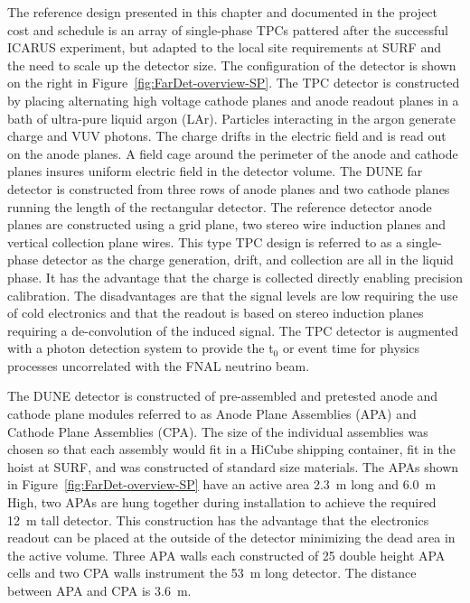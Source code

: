 The reference design presented in this chapter and documented in the project cost and schedule is an array of single-phase TPCs pattered after the successful ICARUS experiment, but adapted to the local site requirements at SURF and the need to scale up the detector size. The configuration of the detector is shown on the right in Figure~\ref{fig:FarDet-overview-SP}.  The TPC detector is constructed by placing alternating high voltage cathode planes and anode readout planes in a bath of ultra-pure liquid argon (LAr). Particles interacting in the argon generate charge and VUV photons. The charge drifts in the electric field and is read out on the anode planes. A field cage around the perimeter of the anode and cathode planes insures uniform electric field in the detector volume. The DUNE far detector is  constructed from three rows of anode planes and two cathode planes running the length of the rectangular detector. The reference detector anode planes are constructed using a grid plane, two stereo wire induction planes and vertical collection plane wires. This type TPC design is referred to as a single-phase detector as the charge generation, drift, and collection are all in the liquid phase. It has the advantage that the charge is collected directly enabling precision calibration. The disadvantages are that the signal levels are low requiring the use of cold electronics and that the readout is based on stereo induction planes requiring a de-convolution of the induced signal. The TPC detector is augmented with a photon detection system to provide the t$_0$ or event time for physics processes uncorrelated with the FNAL neutrino beam.

The DUNE detector is constructed of pre-assembled and pretested anode and cathode plane modules referred to as Anode Plane Assemblies (APA) and Cathode Plane Assemblies (CPA). The size of the individual assemblies was chosen so that each assembly would fit in a HiCube shipping container, fit in the hoist at SURF, and was constructed of standard size materials. The APAs shown in Figure~\ref{fig:FarDet-overview-SP}  have an active area 2.3~m long and 6.0~m High, two APAs are hung together during installation to achieve the required 12~m tall detector. This construction has the advantage that the electronics readout can be placed at the outside of the detector minimizing the dead area in the active volume. Three APA walls each constructed of 25 double height APA cells  and two CPA walls instrument the 53~m long detector. The distance between APA and CPA is 3.6~m.



